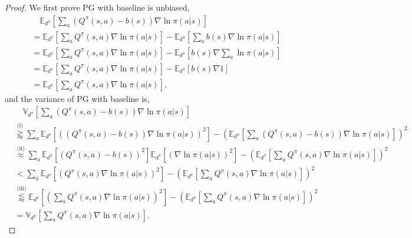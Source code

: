 \begin{proof}
We first prove PG with baseline is unbiased,
    \begin{equation}
        \begin{aligned}
            &\quad\mathbb{E}_{ d^\pi}\left [\sum_a (Q^\pi(s,a) -b(s)) \nabla\ln\pi(a|s)\right]\\
            &=\mathbb{E}_{ d^\pi}\left [\sum_a Q^\pi(s,a)\nabla\ln\pi(a|s)\right] -\mathbb{E}_{ d^\pi}\left [\sum_a b(s) \nabla\ln\pi(a|s)\right]\\
            &= \mathbb{E}_{ d^\pi}\left [\sum_a Q^\pi(s,a)\nabla\ln\pi(a|s)\right] - \mathbb{E}_{ d^\pi}\left [b(s) \nabla\sum_a \ln\pi(a|s)\right]\\
            &=\mathbb{E}_{ d^\pi}\left [\sum_a Q^\pi(s,a)\nabla\ln\pi(a|s)\right] - \mathbb{E}_{ d^\pi}\left [b(s) \nabla 1\right]\\
            &=\mathbb{E}_{ d^\pi}\left [\sum_a Q^\pi(s,a)\nabla\ln\pi(a|s)\right],
        \end{aligned} \nonumber
    \end{equation}
and the variance of PG with baseline is,
    \begin{equation}
        \begin{aligned}
            &\quad \mathbb{V}_{ d^\pi}
            \left [\sum_a (Q^\pi(s,a) -b(s)) \nabla\ln\pi(a|s)\right]\\ 
            &\stackrel{\text{(i)}}{\gtrapprox} \sum_a \mathbb{E}_{ d^\pi} \left [ \left((Q^\pi(s,a) -b(s)) \nabla\ln\pi(a|s)\right)^2\right] - \left(\mathbb{E}_{ d^\pi} \left [\sum_a (Q^\pi(s,a) -b(s)) \nabla\ln\pi(a|s)\right]\right)^2 \\
             &\stackrel{\text{(ii)}}{\approx} \sum_a \mathbb{E}_{ d^\pi} \left [\left(Q^\pi(s,a) -b(s)\right)^2\right] \mathbb{E}_{ d^\pi}\left[\left(\nabla\ln\pi(a|s)\right)^2\right] - \left(\mathbb{E}_{d^\pi} \left [\sum_a Q^\pi(s,a) \nabla\ln\pi(a|s)\right]\right)^2 \\
             &< \sum_a \mathbb{E}_{ d^\pi} \left [\left(Q^\pi(s,a)\nabla\ln\pi(a|s)\right)^2\right] - \left(\mathbb{E}_{ d^\pi} \left[\sum_a Q^\pi(s,a) \nabla\ln\pi(a|s)\right]\right)^2 \\
             &\stackrel{\text{(iii)}}{\lessapprox} \mathbb{E}_{ d^\pi} \left [\left(\sum_a Q^\pi(s,a)\nabla\ln\pi(a|s)\right)^2\right] - \left(\mathbb{E}_{ d^\pi} \left[\sum_a Q^\pi(s,a) \nabla\ln\pi(a|s)\right]\right)^2 \\
             &= \mathbb{V}_{ d^\pi} \left[ \sum_a Q^\pi(s,a)\nabla \ln \pi(a|s)\right].
        \end{aligned} \nonumber
    \end{equation}
    

\end{proof}
